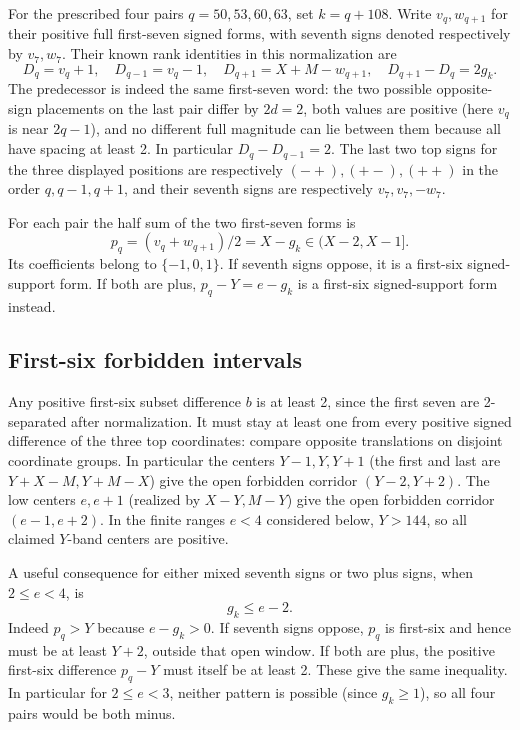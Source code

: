 \documentclass[
  11pt,
]{article}
\begin{document}
For the prescribed four pairs \(q=50,53,60,63\), set \(k=q+108\). Write
\(v_q,w_{q+1}\) for their positive full first-seven signed forms, with
seventh signs denoted respectively by \(v_7,w_7\). Their known rank
identities in this normalization are \[
 D_q=v_q+1,\quad
 D_{q-1}=v_q-1,\quad
 D_{q+1}=X+M-w_{q+1},\quad
 D_{q+1}-D_q=2g_k .
\] The predecessor is indeed the same first-seven word: the two possible
opposite-sign placements on the last pair differ by \(2d=2\), both
values are positive (here \(v_q\) is near \(2q-1\)), and no different
full magnitude can lie between them because all have spacing at least 2.
In particular \(D_q-D_{q-1}=2\). The last two top signs for the three
displayed positions are respectively \((-+),(+-),(++)\) in the order
\(q,q-1,q+1\), and their seventh signs are respectively
\(v_7,v_7,-w_7\).

For each pair the half sum of the two first-seven forms is \[
 p_q=(v_q+w_{q+1})/2=X-g_k\in(X-2,X-1].
\] Its coefficients belong to \(\{-1,0,1\}\). If seventh signs oppose,
it is a first-six signed-support form. If both are plus, \(p_q-Y=e-g_k\)
is a first-six signed-support form instead.

\subsection{First-six forbidden
intervals}\label{first-six-forbidden-intervals}

Any positive first-six subset difference \(b\) is at least 2, since the
first seven are 2-separated after normalization. It must stay at least
one from every positive signed difference of the three top coordinates:
compare opposite translations on disjoint coordinate groups. In
particular the centers \(Y-1,Y,Y+1\) (the first and last are
\(Y+X-M,Y+M-X\)) give the open forbidden corridor \((Y-2,Y+2)\). The low
centers \(e,e+1\) (realized by \(X-Y,M-Y\)) give the open forbidden
corridor \((e-1,e+2)\). In the finite ranges \(e<4\) considered below,
\(Y>144\), so all claimed \(Y\)-band centers are positive.

A useful consequence for either mixed seventh signs or two plus signs,
when \(2\le e<4\), is \[
 g_k\le e-2 .
\] Indeed \(p_q>Y\) because \(e-g_k>0\). If seventh signs oppose,
\(p_q\) is first-six and hence must be at least \(Y+2\), outside that
open window. If both are plus, the positive first-six difference
\(p_q-Y\) must itself be at least 2. These give the same inequality. In
particular for \(2\le e<3\), neither pattern is possible (since
\(g_k\ge1\)), so all four pairs would be both minus.
\end{document}
